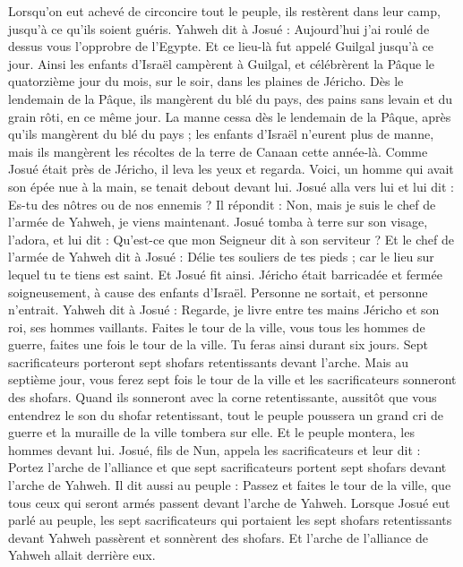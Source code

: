 \begin{multicols}{2}
Lorsqu’on eut achevé de circoncire tout le peuple, ils restèrent dans leur camp, jusqu’à ce qu’ils soient guéris.
Yahweh dit à Josué : Aujourd’hui j’ai roulé de dessus vous l’opprobre de l’Egypte. Et ce lieu-là fut appelé Guilgal jusqu’à ce jour.
Ainsi les enfants d’Israël campèrent à Guilgal, et célébrèrent la Pâque le quatorzième jour du mois, sur le soir, dans les plaines de Jéricho.
Dès le lendemain de la Pâque, ils mangèrent du blé du pays, des pains sans levain et du grain rôti, en ce même jour.
La manne cessa dès le lendemain de la Pâque, après qu’ils mangèrent du blé du pays ; les enfants d’Israël n’eurent plus de manne, mais ils mangèrent les récoltes de la terre de Canaan cette année-là.
Comme Josué était près de Jéricho, il leva les yeux et regarda. Voici, un homme qui avait son épée nue à la main, se tenait debout devant lui. Josué alla vers lui et lui dit : Es-tu des nôtres ou de nos ennemis ?
Il répondit : Non, mais je suis le chef de l’armée de Yahweh, je viens maintenant. Josué tomba à terre sur son visage, l’adora, et lui dit : Qu’est-ce que mon Seigneur dit à son serviteur ?
Et le chef de l’armée de Yahweh dit à Josué : Délie tes souliers de tes pieds ; car le lieu sur lequel tu te tiens est saint. Et Josué fit ainsi.
\VerseOne{}Jéricho était barricadée et fermée soigneusement, à cause des enfants d’Israël. Personne ne sortait, et personne n’entrait.
Yahweh dit à Josué : Regarde, je livre entre tes mains Jéricho et son roi, ses hommes vaillants.
Faites le tour de la ville, vous tous les hommes de guerre, faites une fois le tour de la ville. Tu feras ainsi durant six jours.
Sept sacrificateurs porteront sept shofars retentissants devant l’arche. Mais au septième jour, vous ferez sept fois le tour de la ville et les sacrificateurs sonneront des shofars.
Quand ils sonneront avec la corne retentissante, aussitôt que vous entendrez le son du shofar retentissant, tout le peuple poussera un grand cri de guerre et la muraille de la ville tombera sur elle. Et le peuple montera, les hommes devant lui.
Josué, fils de Nun, appela les sacrificateurs et leur dit : Portez l’arche de l’alliance et que sept sacrificateurs portent sept shofars devant l’arche de Yahweh.
Il dit aussi au peuple : Passez et faites le tour de la ville, que tous ceux qui seront armés passent devant l’arche de Yahweh.
Lorsque Josué eut parlé au peuple, les sept sacrificateurs qui portaient les sept shofars retentissants devant Yahweh passèrent et sonnèrent des shofars. Et l’arche de l’alliance de Yahweh allait derrière eux.

\end{multicols}
